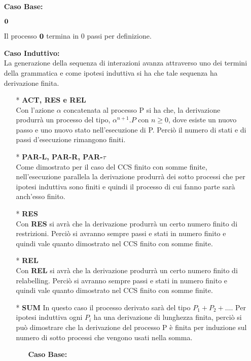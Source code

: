 \begin{itemize}
	\item[] \textbf{Caso Base:} \mbox{}
	
	$\mathbf{0}$
	
	Il processo $\mathbf{0}$ termina in 0 passi per definizione.
	\\
	\item[] \textbf{Caso Induttivo:} \mbox{}
	\\
	La generazione della sequenza di interazioni avanza attraverso uno dei termini della grammatica e come ipotesi induttiva si ha che tale sequenza ha derivazione finita.
	\begin{itemize}
		
		\item[*] \textbf{ACT, RES e REL}
		\\
		Con l'azione $\alpha$ concatenata al processo P si ha che, la derivazione produrrà un processo del tipo, \(\alpha^{n+1}.P\) con \(n \geq 0\), dove esiste un nuovo passo e uno nuovo stato nell'esecuzione di P. Perciò il numero di stati e di passi d'esecuzione rimangono finiti.
		\\
		\item[*] \textbf{PAR-L, PAR-R, PAR-$\tau$}
		\\
		Come dimostrato per il caso del CCS finito con somme finite, nell'esecuzione parallela la derivazione produrrà dei sotto processi che per ipotesi induttiva sono finiti e quindi il processo di cui fanno parte sarà anch'esso finito.
		\\
		\item[*] \textbf{RES}
		\\
		Con \textbf{RES} si avrà che la derivazione produrrà un certo numero finito di restrizioni. Perciò si avranno sempre passi e stati in numero finito e quindi vale quanto dimostrato nel CCS finito con somme finite.
		\\
		\item[*] \textbf{REL}
		\\
		Con \textbf{REL} si avrà che la derivazione produrrà un certo numero finito di relabelling. Perciò si avranno sempre passi e stati in numero finito e quindi vale quanto dimostrato nel CCS finito con somme finite.
		\\
		\item[*] \textbf{SUM}
		In questo caso il processo derivato sarà del tipo \(P_1+P_2+\ldots\). Per ipotesi induttiva ogni \(P_i\) ha una derivazione di lunghezza finita, perciò si può dimostrare che la derivazione del processo P è finita per induzione sul numero di sotto processi che vengono usati nella somma. \\
		\begin{itemize}
			\item[] \textbf{Caso Base:} \mbox{}
			

\end{itemize}
\end{itemize}
\end{itemize}

